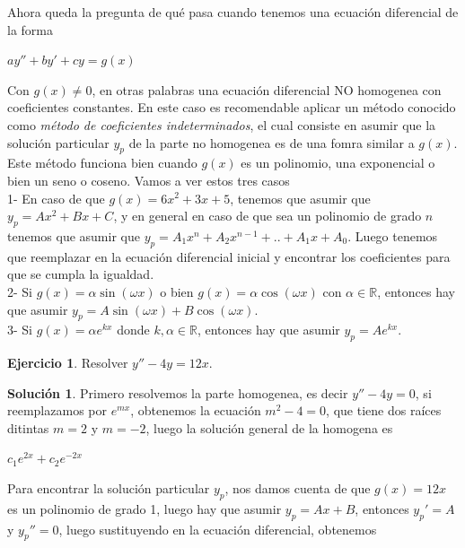 \documentclass{article}
\theoremstyle{plain}
\theoremstyle{definition}
\newtheorem{ejer}[thm]{Ejercicio}
\newtheorem{sol}[thm]{Solución}
\begin{document}
Ahora queda la pregunta de qué pasa cuando tenemos una ecuación diferencial de la forma

\begin{center}
$ay''+by'+cy = g(x)$
\end{center}

Con $g(x) \neq 0$, en otras palabras una ecuación diferencial NO homogenea con coeficientes constantes. En este caso es recomendable aplicar un método conocido como \textit{método de coeficientes indeterminados}, el cual consiste en asumir que la solución particular $y_p$ de la parte no homogenea es de una fomra similar a $g(x)$. Este método funciona bien cuando $g(x)$ es un polinomio, una exponencial o bien un seno o coseno. Vamos a ver estos tres casos \\

1- En caso de que $g(x)= 6x^2+3x+5$, tenemos que asumir que $y_p= Ax^2+Bx+C$, y en general en caso de que sea un polinomio de grado $n$ tenemos que asumir que $y_p = A_1x^n+A_2x^{n-1}+.. +A_1x +A_0$. Luego tenemos que reemplazar en la ecuación diferencial inicial y encontrar los coeficientes para que se cumpla la igualdad. \\

2- Si $g(x)=\alpha\sin(\omega x)$ o bien $g(x)=\alpha\cos(\omega x)$ con $\alpha \in \mathbb{R}$, entonces hay que asumir $y_p= A\sin(\omega x)+B\cos(\omega x)$. \\

3- Si $g(x)= \alpha e^{kx}$ donde $k,\alpha \in\mathbb{R}$, entonces hay que asumir $y_p= Ae^{kx}$. \\



\begin{ejer}Resolver $y''-4y=12x$. \\
\end{ejer}

\begin{sol}Primero resolvemos la parte homogenea, es decir $y''-4y=0$, si reemplazamos por $e^{mx}$, obtenemos la ecuación $m^2-4=0$, que tiene dos raíces ditintas $m=2$ y $m=-2$, luego la solución general de la homogena es
\end{sol}

\begin{center}
$c_1e^{2x}+c_2e^{-2x}$
\end{center}

Para encontrar la solución particular $y_p$, nos damos cuenta de que $g(x)= 12x$ es un polinomio de grado 1, luego hay que asumir $y_p= Ax+B$, entonces $y_p'=A$ y $y_p''= 0$, luego sustituyendo en la ecuación diferencial, obtenemos
\end{document}
